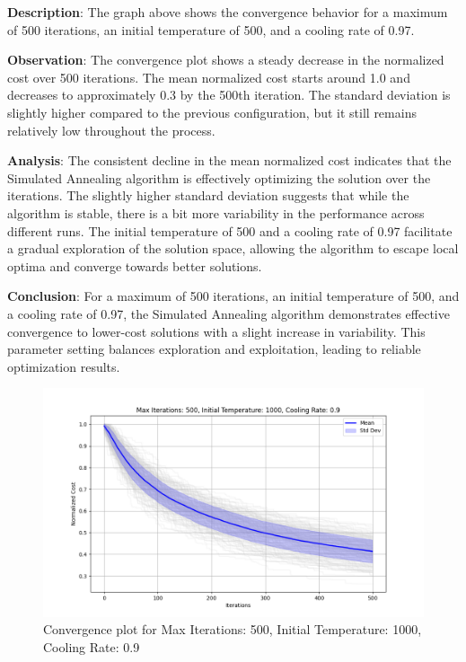 \documentclass{article}
\begin{document}
    \textbf{Description}: The graph above shows the convergence behavior for a maximum of 500 iterations, an initial temperature of 500, and a cooling rate of 0.97.

    \textbf{Observation}: The convergence plot shows a steady decrease in the normalized cost over 500 iterations. The mean normalized cost starts around 1.0 and decreases to approximately 0.3 by the 500th iteration. The standard deviation is slightly higher compared to the previous configuration, but it still remains relatively low throughout the process.

    \textbf{Analysis}: The consistent decline in the mean normalized cost indicates that the Simulated Annealing algorithm is effectively optimizing the solution over the iterations. The slightly higher standard deviation suggests that while the algorithm is stable, there is a bit more variability in the performance across different runs. The initial temperature of 500 and a cooling rate of 0.97 facilitate a gradual exploration of the solution space, allowing the algorithm to escape local optima and converge towards better solutions.

    \textbf{Conclusion}: For a maximum of 500 iterations, an initial temperature of 500, and a cooling rate of 0.97, the Simulated Annealing algorithm demonstrates effective convergence to lower-cost solutions with a slight increase in variability. This parameter setting balances exploration and exploitation, leading to reliable optimization results.

    \begin{figure}[H]
        \centering
        \includegraphics[width=\textwidth]{simulated_annealing/max_iter_500_init_temp_1000_cooling_rate_0.9}
        \caption{Convergence plot for Max Iterations: 500, Initial Temperature: 1000, Cooling Rate: 0.9}
        \label{fig:sa_500_1000_0.9}
    \end{figure}
\end{document}
